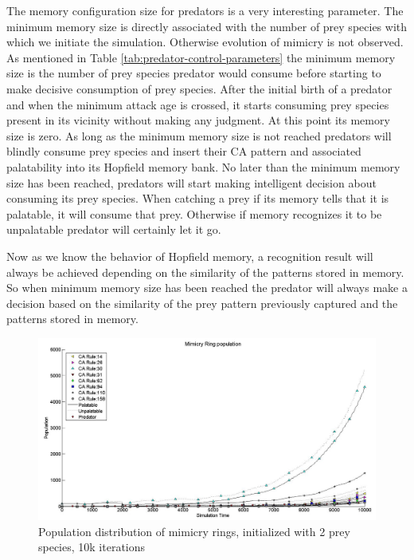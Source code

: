 The memory configuration size for predators is a very interesting parameter. The minimum memory size is directly associated with the number of prey species with which we initiate the simulation. Otherwise evolution of mimicry is not observed. As mentioned in Table \ref{tab:predator-control-parameters} the minimum memory size is the number of prey species predator would consume before starting to make decisive consumption of prey species. After the initial birth of a predator and when the minimum attack age is crossed, it starts consuming prey species present in its vicinity without making any judgment. At this point its memory size is zero. As long as the minimum memory size is not reached predators will blindly consume prey species and insert their CA pattern and associated palatability into its Hopfield memory bank. No later than the minimum memory size has been reached, predators will start making intelligent decision about consuming its prey species. When catching a prey if its memory tells that it is palatable, it will consume that prey. Otherwise if memory recognizes it to be unpalatable predator will certainly let it go.

Now as we know the behavior of Hopfield memory, a recognition result will always be achieved depending on the similarity of the patterns stored in memory. So when minimum memory size has been reached the predator will always make a decision based on the similarity of the prey pattern previously captured and the patterns stored in memory.

\begin{figure}[H]
	\centering
	\includegraphics[scale=0.40]{images/simTime10k-2Prey}
	\caption[Population distribution of mimicry rings (2 prey species, 10k iterations)]{Population distribution of mimicry rings, initialized with 2 prey species, 10k iterations}
	\label{fig:plot-2-prey}
\end{figure}

